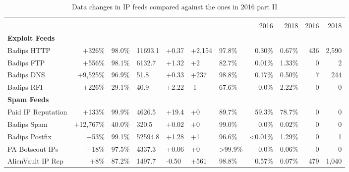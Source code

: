 \begin{table}[t!]
\centering
\caption{Data changes in IP feeds compared against the ones in 2016 part II}
\label{tab:old-volume-overview-2}
\small
 \begin{tabular}{l r H H H H H r r r r }
 \toprule
& & & & & & &  &  \\
\cmidrule(lr){8-9}\cmidrule(l){10-11}
  &  &  &  &  &  &  &   2016 &  2018 &  2016  &  2018 \\ %
  \midrule
  \textbf{Exploit Feeds} \\

Badips HTTP    & $+$326\%    & 98.0\% 	& 11693.1 	& +0.37  & +2,154  & 97.8\%   & 0.30\%  & 0.67\%  & 436 & 2,590 \\
Badips FTP 	   & $+$556\%    & 98.1\% 	& 6132.7    & +1.32  & +2      & 82.7\%   & 0.01\%  & 1.33\%  & 0   & 2\\
Badips DNS 	   & $+$9,525\%     & 96.9\% 	& 51.8      & +0.33  & +237    & 98.8\%   & 0.17\%  & 0.50\%  & 7   & 244  \\
Badips RFI 	   & $+$226\%    & 29.1\%  & 40.9      & +2.22  & -1      & 67.6\%   & 0.0\%   & 2.22\%  & 0   & 0  \\

 \textbf{Spam Feeds} \\
Paid IP Reputation 	 & $+$133\%	     & 99.9\%      & 4626.5    & +19.4   & +0      & 89.7\%  & 59.3\%    & 78.7\% & 0   & 0\\
Badips Spam 	     & $+$12,767\%    & 40.0\%      & 320.5     & +0.02   & +0      & 99.0\% 	& 0.0\%     & 0.02\% & 0   & 0 \\
Badips Postfix 	     & $-$53\%       & 99.1\%      & 52594.8   & +1.28   & +1      & 96.6\%  & <0.01\%   & 1.29\% & 0   & 1\\
PA Botscout IPs 	 & $+$18\%	     & 97.5\% 	  & 4337.3    & +0.06   & +0      & >99.9\%	& 0.0\%     & 0.06\% & 0   & 0 \\
AlienVault IP Rep 	 & $+$8\%	    & 87.2\% 	  & 1497.7    & -0.50   & +561    & 98.8\% 	& 0.57\%	& 0.07\% & 479  & 1,040 \\


\bottomrule
\end{tabular}
\end{table}




